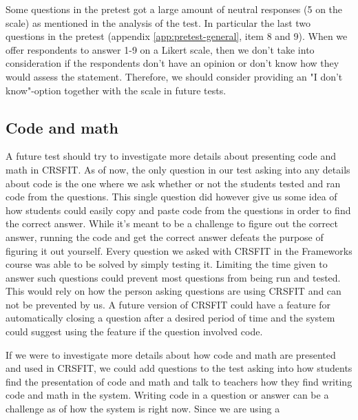 Some questions in the pretest got a large amount of neutral responses (5 on the scale) as mentioned in the analysis of the test. In particular the last two questions in the pretest (appendix \ref{app:pretest-general}, item 8 and 9). When we offer respondents to answer 1-9 on a Likert scale, then we don't take into consideration if the respondents don't have an opinion or don't know how they would assess the statement. Therefore, we should consider providing an "I don't know"-option together with the scale in future tests. 










\subsection{Code and math}
A future test should try to investigate more details about presenting code and math in CRSFIT. As of now, the only question in our test asking into any details about code is the one where we ask whether or not the students tested and ran code from the questions. This single question did however give us some idea of how students could easily copy and paste code from the questions in order to find the correct answer. While it's meant to be a challenge to figure out the correct answer, running the code and get the correct answer defeats the purpose of figuring it out yourself. Every question we asked with CRSFIT in the Frameworks course was able to be solved by simply testing it. Limiting the time given to answer such questions could prevent most questions from being run and tested. This would rely on how the person asking questions are using CRSFIT and can not be prevented by us. A future version of CRSFIT could have a feature for automatically closing a question after a desired period of time and the system could suggest using the feature if the question involved code. %

If we were to investigate more details about how code and math are presented and used in CRSFIT, we could add questions to the test asking into how students find the presentation of code and math and talk to teachers how they find writing code and math in the system. Writing code in a question or answer can be a challenge as of how the system is right now. Since we are using a 

















